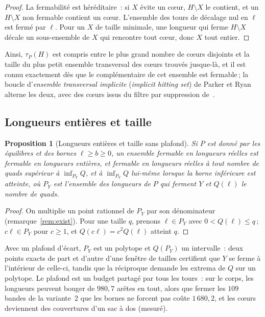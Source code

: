 \documentclass[11pt,a4paper]{article}
\newtheorem{proposition}{Proposition}
\begin{document}
\begin{proof}
La fermabilité est héréditaire~: si $X$ évite un cœur, $H \setminus X$ le
contient, et un $H \setminus X$ non fermable contient un cœur. L'ensemble des
tours de décalage nul en $\ell$ est fermé par $\ell$. Pour un $X$ de taille
minimale, une longueur qui ferme $H \setminus X$ décale un sous-ensemble de
$X$ qui rencontre tout cœur, donc $X$ tout entier.
\end{proof}

Ainsi, $\tau_P(H)$ est compris entre le plus grand nombre de cœurs disjoints
et la taille du plus petit ensemble transversal des cœurs trouvés jusque-là,
et il est connu exactement dès que le complémentaire de cet ensemble est
fermable\,; la boucle d'\emph{ensemble transversal implicite}
(\emph{implicit hitting set}) de Parker et Ryan~\cite{parker1996iis} alterne
les deux, avec des cœurs issus du filtre par suppression
de~\cite{chinneck1991locating}.

\subsection{Longueurs entières et taille}\label{sec:whole}

\begin{proposition}[Longueurs entières et taille sans plafond]\label{prop:whole-size}
Si $P$ est donné par les équilibres et des bornes $\ell \ge b \ge 0$, un
ensemble fermable en longueurs réelles est fermable en longueurs entières, et
fermable en longueurs réelles à tout nombre de quads supérieur à $\inf_{P_Y}
Q$, et à $\inf_{P_Y} Q$ lui-même lorsque la borne inférieure est atteinte, où
$P_Y$ est l'ensemble des longueurs de $P$ qui ferment $Y$ et $Q(\ell)$ le
nombre de quads.
\end{proposition}

\begin{proof}
On multiplie un point rationnel de $P_Y$ par son dénominateur
(remarque~\ref{rem:exist}). Pour une taille $q$, prenons $\ell \in P_Y$ avec
$0 < Q(\ell) \le q$\,; $c\ell \in P_Y$ pour $c \ge 1$, et $Q(c\ell) = c^2
Q(\ell)$ atteint $q$.
\end{proof}

Avec un plafond d'écart, $P_Y$ est un polytope et $Q(P_Y)$ un intervalle~:
deux points exacts de part et d'autre d'une fenêtre de tailles certifient que
$Y$ se ferme à l'intérieur de celle-ci, tandis que la réciproque demande les
extrema de $Q$ sur un polytope. Le plafond est un budget partagé par tous les
tours~: sur le corps, les longueurs peuvent bouger de $980,7$ arêtes en tout,
alors que fermer les $109$ bandes de la variante~2 que les bornes ne forcent
pas coûte $1\,680,2$, et les cœurs deviennent des couvertures d'un sac à dos
(mesuré).
\end{document}
